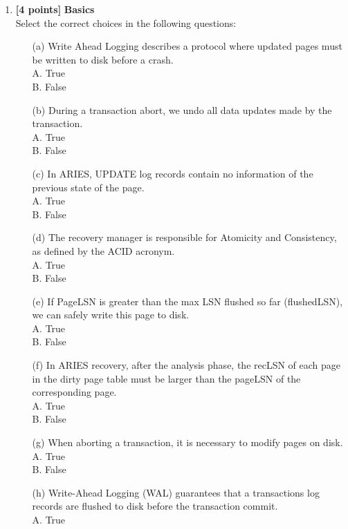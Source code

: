 \documentclass[10pt]{article}
\begin{document}
\begin{enumerate}
	\item \textbf{[4 points]} \textbf{Basics} \\
	      Select the correct choices in the following questions:
	      \begin{itemize}
		      \item[(a)] Write Ahead Logging describes a protocol where updated pages must be written to disk before a crash. \\
		            A. True \\
		            B. False
		      \item[(b)] During a transaction abort, we undo all data updates made by the transaction. \\
		            A. True \\
		            B. False
		      \item[(c)] In ARIES, UPDATE log records contain no information of the previous state of the page. \\
		            A. True \\
		            B. False
		      \item[(d)] The recovery manager is responsible for Atomicity and Consistency, as defined by the ACID acronym. \\
		            A. True \\
		            B. False
		      \item[(e)] If PageLSN is greater than the max LSN flushed so far (flushedLSN), we can safely write this page to disk. \\
		            A. True \\
		            B. False
		      \item[(f)] In ARIES recovery, after the analysis phase, the recLSN of each page in the dirty page table must be larger than the pageLSN of the corresponding page. \\
		            A. True \\
		            B. False
		      \item[(g)] When aborting a transaction, it is necessary to modify pages on disk. \\
		            A. True \\
		            B. False
		      \item[(h)] Write-Ahead Logging (WAL) guarantees that a transactions log records are flushed to disk before the transaction commit. \\
		            A. True \\

\end{itemize}
\end{enumerate}
\end{document}
